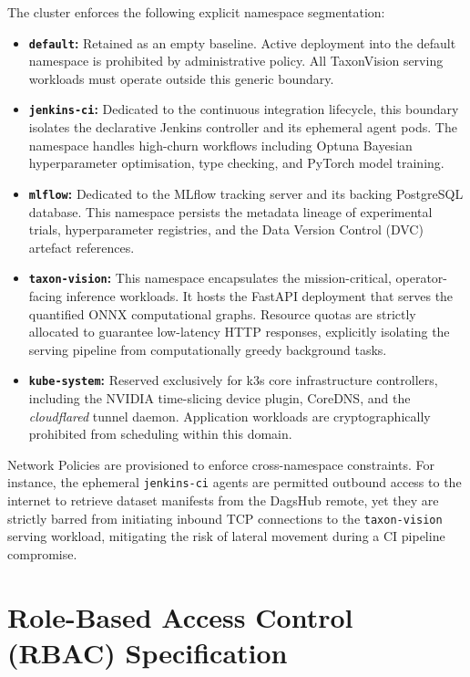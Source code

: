 The cluster enforces the following explicit namespace segmentation:
\begin{itemize}[leftmargin=*, label=\textbullet]
    \item \textbf{\texttt{default}:} Retained as an empty baseline. Active deployment into the default namespace is prohibited by administrative policy. All TaxonVision serving workloads must operate outside this generic boundary.
    \item \textbf{\texttt{jenkins-ci}:} Dedicated to the continuous integration lifecycle, this boundary isolates the declarative Jenkins controller and its ephemeral agent pods. The namespace handles high-churn workflows including Optuna Bayesian hyperparameter optimisation, type checking, and PyTorch model training.
    \item \textbf{\texttt{mlflow}:} Dedicated to the MLflow tracking server and its backing PostgreSQL database. This namespace persists the metadata lineage of experimental trials, hyperparameter registries, and the Data Version Control (DVC) artefact references.
    \item \textbf{\texttt{taxon-vision}:} This namespace encapsulates the mission-critical, operator-facing inference workloads. It hosts the FastAPI deployment that serves the quantified ONNX computational graphs. Resource quotas are strictly allocated to guarantee low-latency HTTP responses, explicitly isolating the serving pipeline from computationally greedy background tasks.
    \item \textbf{\texttt{kube-system}:} Reserved exclusively for k3s core infrastructure controllers, including the NVIDIA time-slicing device plugin, CoreDNS, and the \textit{cloudflared} tunnel daemon. Application workloads are cryptographically prohibited from scheduling within this domain.
\end{itemize}

Network Policies are provisioned to enforce cross-namespace constraints. For instance, the ephemeral \texttt{jenkins-ci} agents are permitted outbound access to the internet to retrieve dataset manifests from the DagsHub remote, yet they are strictly barred from initiating inbound TCP connections to the \texttt{taxon-vision} serving workload, mitigating the risk of lateral movement during a CI pipeline compromise.

\section{Role-Based Access Control (RBAC) Specification}
\label{sec:rbac_specification}

